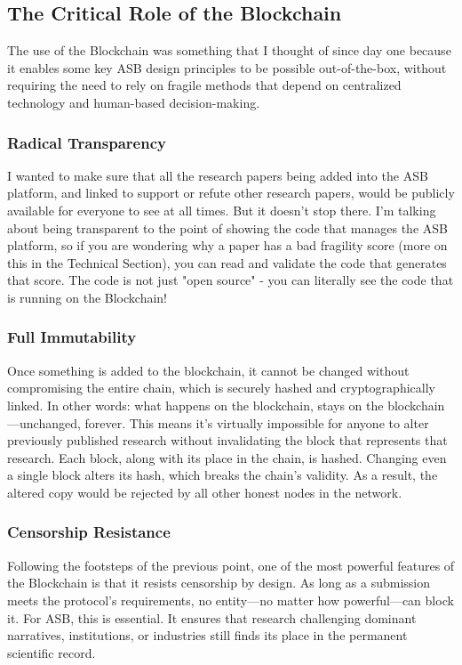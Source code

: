 \subsection{The Critical Role of the Blockchain}
The use of the Blockchain was something that I thought of since day one because it enables some key ASB design principles to be possible out-of-the-box, without requiring the need to rely on fragile methods that depend on centralized technology and human-based decision-making.

\subsubsection{Radical Transparency}
I wanted to make sure that all the research papers being added into the ASB platform, and linked to support or refute other research papers, would be publicly available for everyone to see at all times. But it doesn't stop there. I'm talking about being transparent to the point of showing the code that manages the ASB platform, so if you are wondering why a paper has a bad fragility score (more on this in the Technical Section), you can read and validate the code that generates that score. The code is not just "open source" - you can literally see the code that is running on the Blockchain!

\subsubsection{Full Immutability}
Once something is added to the blockchain, it cannot be changed without compromising the entire chain, which is securely hashed and cryptographically linked. In other words: what happens on the blockchain, stays on the blockchain—unchanged, forever. This means it's virtually impossible for anyone to alter previously published research without invalidating the block that represents that research. Each block, along with its place in the chain, is hashed. Changing even a single block alters its hash, which breaks the chain's validity. As a result, the altered copy would be rejected by all other honest nodes in the network.

\subsubsection{Censorship Resistance}
Following the footsteps of the previous point, one of the most powerful features of the Blockchain is that it resists censorship by design. As long as a submission meets the protocol’s requirements, no entity—no matter how powerful—can block it. For ASB, this is essential. It ensures that research challenging dominant narratives, institutions, or industries still finds its place in the permanent scientific record.

